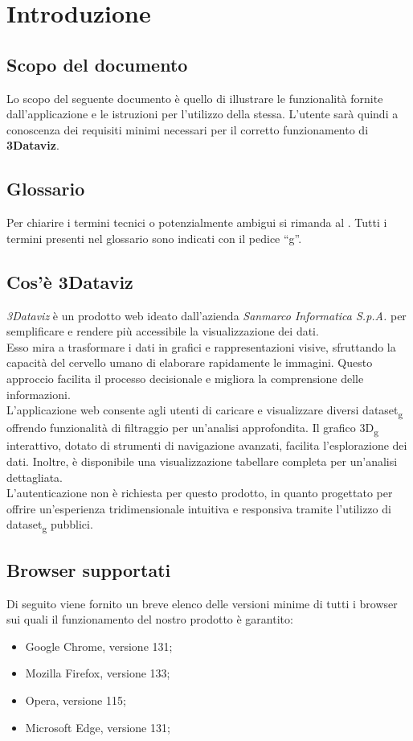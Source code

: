\section{Introduzione}
\subsection{Scopo del documento}
Lo scopo del seguente documento è quello di illustrare le funzionalità fornite dall'applicazione e le istruzioni
per l'utilizzo della stessa. L'utente sarà quindi a conoscenza dei requisiti minimi necessari per il
corretto funzionamento di \textbf{3Dataviz}.

\subsection{Glossario}
Per chiarire i termini tecnici o potenzialmente ambigui si rimanda al .
Tutti i termini presenti nel glossario sono indicati con il pedice “g”. 

\subsection{Cos'è 3Dataviz}
\textit{3Dataviz} è un prodotto web ideato dall'azienda \textit{Sanmarco Informatica S.p.A.} per semplificare e rendere più accessibile la visualizzazione dei dati.\\
Esso mira a trasformare i dati in grafici e rappresentazioni visive, sfruttando la capacità del cervello umano di elaborare rapidamente le immagini. 
Questo approccio facilita il processo decisionale e migliora la comprensione delle informazioni.\\

L'applicazione web consente agli utenti di caricare e visualizzare diversi dataset\textsubscript{g} offrendo funzionalità di filtraggio per un'analisi approfondita.
Il grafico 3D\textsubscript{g} interattivo, dotato di strumenti di navigazione avanzati, facilita l'esplorazione dei dati. 
Inoltre, è disponibile una visualizzazione tabellare completa per un'analisi dettagliata.\\

L'autenticazione non è richiesta per questo prodotto, in quanto progettato per offrire un'esperienza tridimensionale
intuitiva e responsiva tramite l'utilizzo di dataset\textsubscript{g} pubblici.

\subsection{Browser supportati}
Di seguito viene fornito un breve elenco delle versioni minime di tutti i browser sui quali il funzionamento
del nostro prodotto è garantito:
\begin{itemize}
    \item Google Chrome, versione 131;
    \item Mozilla Firefox, versione 133;
    \item Opera, versione 115;
    \item Microsoft Edge, versione 131;
\end{itemize}

